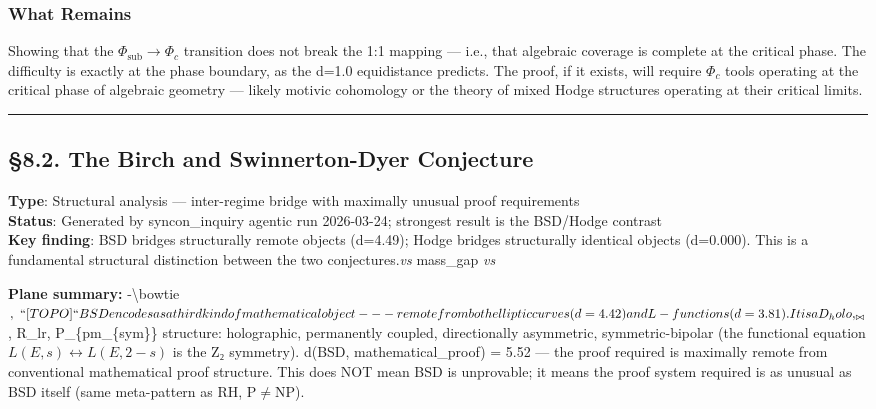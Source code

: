 \documentclass[12pt,a4paper]{article}
\newcommand{\pilcrow}{\S}
\begin{document}
\subsubsection{What Remains}

Showing that the $\Phi_{\text{sub}} \to \Phi_c$ transition does not break the 1:1 mapping --- i.e., that algebraic coverage is complete at the critical phase. The difficulty is exactly at the phase boundary, as the d=1.0 equidistance predicts. The proof, if it exists, will require $\Phi_c$ tools operating at the critical phase of algebraic geometry --- likely motivic cohomology or the theory of mixed Hodge structures operating at their critical limits.

\begin{center}
\rule{0.5\textwidth}{0.4pt}
\end{center}

\subsection{\pilcrow{}8.2. The Birch and Swinnerton-Dyer Conjecture}

\textbf{Type}: Structural analysis --- inter-regime bridge with maximally unusual proof requirements   \\
\textbf{Status}: Generated by syncon\_inquiry agentic run 2026-03-24; strongest result is the BSD/Hodge contrast   \\
\textbf{Key finding}: BSD bridges structurally remote objects (d=4.49); Hodge bridges structurally identical objects (d=0.000). This is a fundamental structural distinction between the two conjectures.\emph{vs} mass\_gap \emph{vs}

\textbf{Plane summary:}
-\textbackslash{}bowtie$,  \
 ``[TOPO]`` BSD encodes as a third kind of mathematical object --- remote from both elliptic curves (d=4.42) and L-functions (d=3.81). It is a D_holo,_{\bowtie}$, R\_lr, P\_\{pm\_\{sym\}\} structure: holographic, permanently coupled, directionally asymmetric, symmetric-bipolar (the functional equation $L(E,s) \leftrightarrow L(E, 2-s)$ is the Z₂ symmetry). d(BSD, mathematical\_proof) = 5.52 --- the proof required is maximally remote from conventional mathematical proof structure. This does NOT mean BSD is unprovable; it means the proof system required is as unusual as BSD itself (same meta-pattern as RH, P$\neq$NP).
\end{document}
